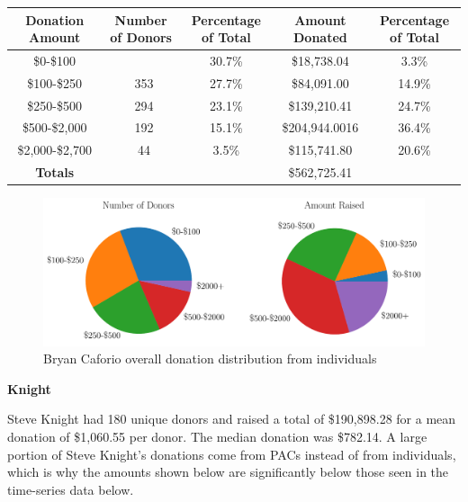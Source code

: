\documentclass[10pt]{article}
\begin{document}
\begin{table}[ht]
\begin{tabularx}{\textwidth}{c | c c | c c}
 \bf{Donation Amount} & \bf{Number of Donors} & \bf{Percentage of Total} & \bf{Amount Donated} & \bf{Percentage of Total} \\ \hline
\enspace \enspace \enspace \$0-\$100 &\quad \quad \quad 392 & 30.7\% &\quad \quad  \$18,738.04 & 3.3\%\\ \hline
\enspace \enspace \enspace \$100-\$250 &\quad \quad \quad \ 353 & 27.7\% &\quad \quad \$84,091.00 & 14.9\% \\ \hline
\enspace \enspace \enspace \$250-\$500 &\quad \quad \quad \ 294 & 23.1\% &\quad \quad\$139,210.41 & 24.7\%\\ \hline
\enspace \enspace \enspace \$500-\$2,000 &\quad \quad \quad \ 192 & 15.1\% &\quad \quad \$204,944.0016 & 36.4\%\\ \hline
\enspace \enspace \enspace \$2,000-\$2,700 &\quad \quad \quad \ 44 & 3.5\% &\quad \quad \$115,741.80 & 20.6\% \\ \hline
\bf{Totals} & \quad \quad \quad 1275 & & \quad \quad \$562,725.41 &\\  
\end{tabularx}
\end{table}
\begin{figure}[h]
\includegraphics[width=0.8\linewidth, center]{Caforio_Totals.pdf}
\caption{Bryan Caforio overall donation distribution from individuals}
\end{figure}

{\Large \bf{Knight}}

Steve Knight had 180 unique donors and raised a total of \$190,898.28 for a mean donation of \$1,060.55 per donor. The median donation was \$782.14. A large portion of Steve Knight's donations come from PACs instead of from individuals, which is why the amounts shown below are significantly below those seen in the time-series data below. 
\end{document}
